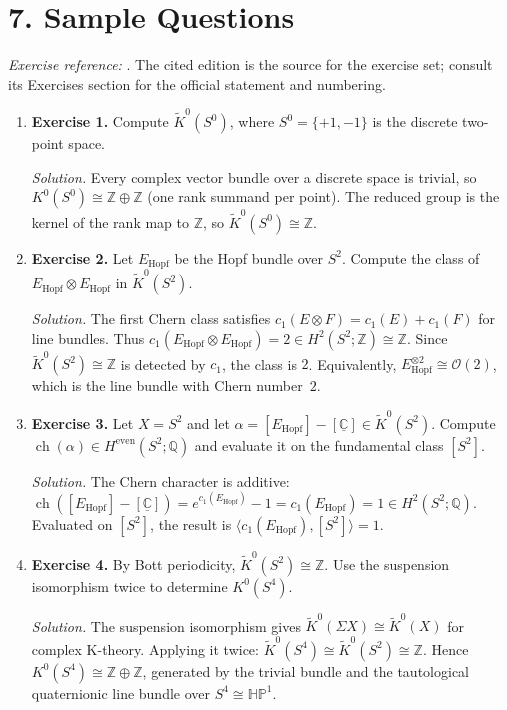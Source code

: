 \section*{7. Sample Questions}
\emph{Exercise reference:} \cite{k_theory_ref1}. The cited edition is the source for the exercise set; consult its Exercises section for the official statement and numbering.
\begin{enumerate}[leftmargin=*,itemsep=0.9em]
\item \textbf{Exercise 1.} Compute $\widetilde{K}^0(S^0)$, where $S^0=\{+1,-1\}$ is the discrete two-point space.

\emph{Solution.} Every complex vector bundle over a discrete space is trivial, so $K^0(S^0)\cong\mathbb{Z}\oplus\mathbb{Z}$ (one rank summand per point). The reduced group is the kernel of the rank map to $\mathbb{Z}$, so $\widetilde{K}^0(S^0)\cong\mathbb{Z}$.

\item \textbf{Exercise 2.} Let $E_{\mathrm{Hopf}}$ be the Hopf bundle over $S^2$. Compute the class of $E_{\mathrm{Hopf}}\otimes E_{\mathrm{Hopf}}$ in $\widetilde{K}^0(S^2)$.

\emph{Solution.} The first Chern class satisfies $c_1(E\otimes F)=c_1(E)+c_1(F)$ for line bundles. Thus $c_1(E_{\mathrm{Hopf}}\otimes E_{\mathrm{Hopf}})=2\in H^2(S^2;\mathbb{Z})\cong\mathbb{Z}$. Since $\widetilde{K}^0(S^2)\cong\mathbb{Z}$ is detected by $c_1$, the class is $2$. Equivalently, $E_{\mathrm{Hopf}}^{\otimes 2}\cong\mathcal{O}(2)$, which is the line bundle with Chern number~$2$.

\item \textbf{Exercise 3.} Let $X=S^2$ and let $\alpha=[E_{\mathrm{Hopf}}]-[\underline{\mathbb{C}}]\in\widetilde{K}^0(S^2)$. Compute $\operatorname{ch}(\alpha)\in H^{\mathrm{even}}(S^2;\mathbb{Q})$ and evaluate it on the fundamental class $[S^2]$.

\emph{Solution.} The Chern character is additive: $\operatorname{ch}([E_{\mathrm{Hopf}}]-[\underline{\mathbb{C}}])=e^{c_1(E_{\mathrm{Hopf}})}-1=c_1(E_{\mathrm{Hopf}})=1\in H^2(S^2;\mathbb{Q})$. Evaluated on $[S^2]$, the result is $\langle c_1(E_{\mathrm{Hopf}}),[S^2]\rangle=1$.

\item \textbf{Exercise 4.} By Bott periodicity, $\widetilde{K}^0(S^2)\cong\mathbb{Z}$. Use the suspension isomorphism twice to determine $K^0(S^4)$.

\emph{Solution.} The suspension isomorphism gives $\widetilde{K}^0(\Sigma X)\cong \widetilde{K}^0(X)$ for complex K-theory. Applying it twice: $\widetilde{K}^0(S^4)\cong\widetilde{K}^0(S^2)\cong\mathbb{Z}$. Hence $K^0(S^4)\cong\mathbb{Z}\oplus\mathbb{Z}$, generated by the trivial bundle and the tautological quaternionic line bundle over $S^4\cong\mathbb{HP}^1$.


\end{enumerate}
